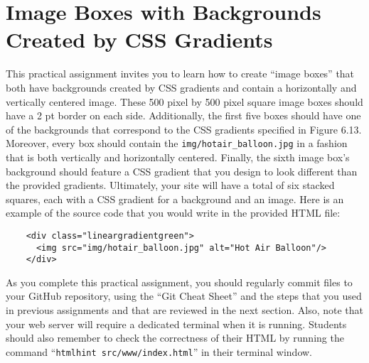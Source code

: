 \documentclass[11pt]{article}
\newcommand{\command}[1]{``\lstinline{#1}''}
\newcommand{\program}[1]{\lstinline{#1}}
\begin{document}
\section*{Image Boxes with Backgrounds Created by CSS Gradients}



This practical assignment invites you to learn how to create ``image boxes''
that both have backgrounds created by CSS gradients and contain a horizontally
and vertically centered image. These 500 pixel by 500 pixel square image boxes
should have a 2 pt border on each side. Additionally, the first five boxes
should have one of the backgrounds that correspond to the CSS gradients
specified in Figure 6.13. Moreover, every box should contain the
\program{img/hotair_balloon.jpg} in a fashion that is both vertically and
horizontally centered. Finally, the sixth image box's background should feature
a CSS gradient that you design to look different than the provided gradients.
Ultimately, your site will have a total of six stacked squares, each with a CSS
gradient for a background and an image. Here is an example of the source code
that you would write in the provided HTML file:

\begin{verbatim}
    <div class="lineargradientgreen">
      <img src="img/hotair_balloon.jpg" alt="Hot Air Balloon"/>
    </div>
\end{verbatim}

As you complete this practical assignment, you should regularly commit files to
your GitHub repository, using the ``Git Cheat Sheet'' and the steps that you
used in previous assignments and that are reviewed in the next section. Also,
note that your web server will require a dedicated terminal when it is running.
Students should also remember to check the correctness of their HTML by running
the command \command{htmlhint src/www/index.html} in their terminal window.

\end{document}
